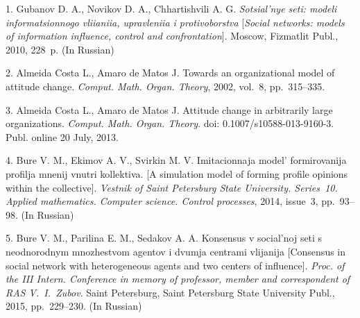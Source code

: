 

{\footnotesize

\vskip 2mm


\vskip 1.5mm



1.  Gubanov D. A.,  Novikov D. A.,  Chhartishvili A. G. {\it
Sotsial'nye seti: modeli informatsionnogo vliianiia, upravleniia i
protivoborstva}  [{\it Social networks: models of information
influence, control and confrontation}].   Moscow, Fizmatlit Publ.,
2010, 228~p. (In Russian)

2. Almeida Costa L., Amaro de Matos J. Towards an organizational
model of attitude change.  {\it Comput. Math. Organ. Theory},
2002, vol.~8,  pp.~315--335.

3. Almeida Costa L., Amaro de Matos J. Attitude change in
arbitrarily large organizations. {\it Comput. Math. Organ.
Theory}. doi: 0.1007/s10588-013-9160-3. Publ. online 20 July,
2013.

4. Bure V. M., Ekimov A. V., Svirkin M. V. Imitacionnaja model'
formirovanija profilja mnenij vnutri kollektiva. [A simulation
model of forming profile opinions  within the collective]. {\it
Vestnik of Saint Petersburg State University. Series~10. Applied
mathematics. Computer science. Control processes}, 2014, issue~3,
pp.~93--98. (In Russian)

5. Bure V. M., Parilina E. M., Sedakov A. A. Konsensus v
social'noj seti s neodnorodnym mnozhestvom agentov i dvumja
centrami vlijanija  [Consensus in social network with
heterogeneous agents and two centers of  influence].  {\it Proc.
of the III Intern. Conference in memory of professor, member and
correspondent of RAS V.~I.~Zubov}. Saint Petersburg, Saint
Petersburg State University Publ., 2015, pp.~229--230. (In
Russian)





}
